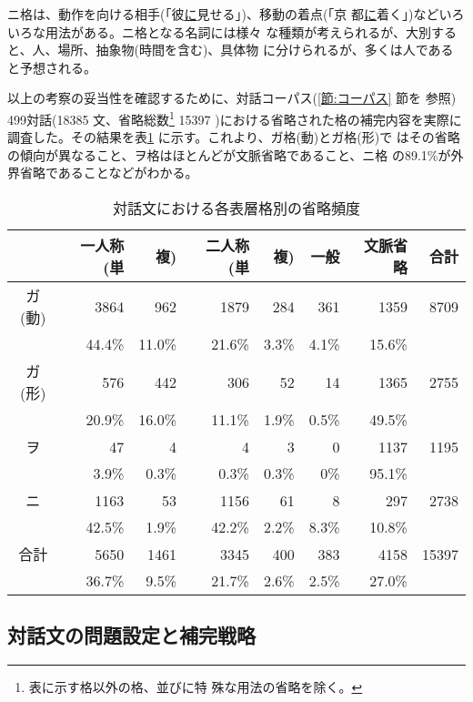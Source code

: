 ニ格は、動作を向ける相手(「彼\underline{に}見せる」)、移動の着点(「京
都\underline{に}着く」)などいろいろな用法がある。ニ格となる名詞には様々
な種類が考えられるが、大別すると、人、場所、抽象物(時間を含む)、具体物
に分けられるが、多くは人であると予想される。

以上の考察の妥当性を確認するために、対話コーパス(\ref{節:コーパス} 節を
参照) 499対話(18385 文、省略総数\footnote{表に示す格以外の格、並びに特
殊な用法の省略を除く。} 15397 )における省略された格の補完内容を実際に
調査した。その結果を表\ref{調査} に示す。これより、ガ格(動)とガ格(形)で
はその省略の傾向が異なること、ヲ格はほとんどが文脈省略であること、ニ格
の89.1\%が外界省略であることなどがわかる。


\begin{table}
\begin{center}
\caption{対話文における各表層格別の省略頻度}
\label{調査}
\begin{tabular}{c|rrrrrr|r}
\hline\hline
   & 一人称(単 & 複) & 二人称(単 & 複) & 一般\footnotemark & 文脈省略 & 合計 \\
\hline           
ガ(動) & 3864 & 962 & 1879 & 284       & 361   & 1359     & 8709 \\
& 44.4\% & 11.0\% & 21.6\% & 3.3\%     & 4.1\% & 15.6\%   & \\
ガ(形) &  576 & 442 &  306 &  52       &  14   & 1365     & 2755 \\
& 20.9\% & 16.0\% & 11.1\% & 1.9\%     & 0.5\% & 49.5\%   & \\
ヲ     &   47 &   4 &    4 &   3       &   0   & 1137     & 1195 \\
& 3.9\% & 0.3\% & 0.3\% & 0.3\%        & 0\%   & 95.1\%   & \\
ニ     & 1163 &  53 & 1156 &  61       &   8   &  297     & 2738 \\
& 42.5\% & 1.9\% & 42.2\% & 2.2\%      & 8.3\% & 10.8\%   & \\
\hline           
合計   & 5650 & 1461 & 3345 & 400      & 383   & 4158     & 15397 \\
& 36.7\% & 9.5\% & 21.7\% & 2.6\%      & 2.5\% & 27.0\%   & \\
\hline
\end{tabular}
\end{center}
\end{table}


\subsection{対話文の問題設定と補完戦略}

